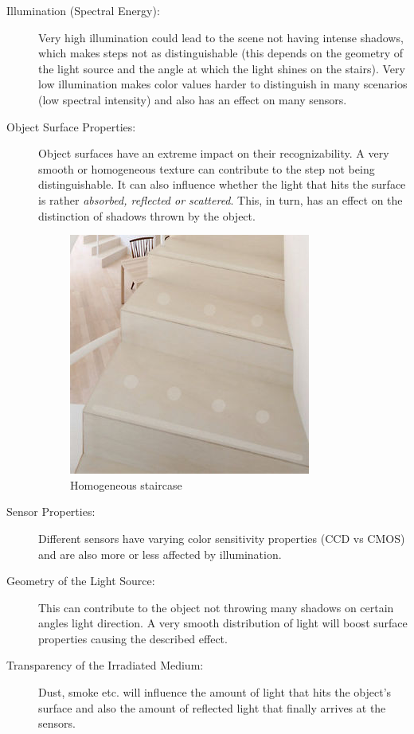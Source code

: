 \documentclass[a4paper,12pt]{article}
\begin{document}
	\begin{description}
		\item[Illumination (Spectral Energy):] Very high illumination could lead to the scene not having intense shadows, which makes steps not as distinguishable (this depends on the geometry of the light source and the angle at which the light shines on the stairs). Very low illumination makes color values harder to distinguish in many scenarios (low spectral intensity) and also has an effect on many sensors.
		
		\item[Object Surface Properties:] Object surfaces have an extreme impact on their recognizability. A very smooth or homogeneous texture can contribute to the step not being distinguishable. It can also influence whether the light that hits the surface is rather \emph{absorbed, reflected or scattered}. This, in turn, has an effect on the distinction of shadows thrown by the object.
		
				\begin{figure}[h!]	
					\centering
					\includegraphics[scale=0.5]{homogene_treppe.JPG}
					\caption{Homogeneous staircase}
				\end{figure}
				
		\item[Sensor Properties:] Different sensors have varying color sensitivity properties (CCD vs CMOS) and are also more or less affected by illumination.
		
		\item[Geometry of the Light Source:] This can contribute to the object not throwing many shadows on certain angles light direction. A very smooth distribution of light will boost surface properties causing the described effect.
		
		\item[Transparency of the Irradiated Medium:] Dust, smoke etc. will influence the amount of light that hits the object's surface and also the amount of reflected light that finally arrives at the sensors.
	\end{description}
	
\end{document}
